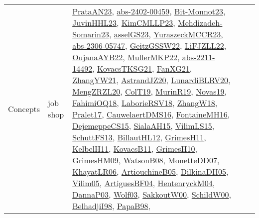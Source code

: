 {\begin{longtable}{llp{6cm}p{6cm}p{6cm}}
Concepts & job shop & \href{articles/PrataAN23.pdf}{PrataAN23}\cite{PrataAN23}, \href{articles/abs-2402-00459.pdf}{abs-2402-00459}\cite{abs-2402-00459}, \href{papers/Bit-Monnot23.pdf}{Bit-Monnot23}\cite{Bit-Monnot23}, \href{papers/JuvinHHL23.pdf}{JuvinHHL23}\cite{JuvinHHL23}, \href{papers/KimCMLLP23.pdf}{KimCMLLP23}\cite{KimCMLLP23}, \href{papers/Mehdizadeh-Somarin23.pdf}{Mehdizadeh-Somarin23}\cite{Mehdizadeh-Somarin23}, \href{papers/asselGS23.pdf}{asselGS23}\cite{asselGS23}, \href{articles/YuraszeckMCCR23.pdf}{YuraszeckMCCR23}\cite{YuraszeckMCCR23}, \href{articles/abs-2306-05747.pdf}{abs-2306-05747}\cite{abs-2306-05747}, \href{papers/GeitzGSSW22.pdf}{GeitzGSSW22}\cite{GeitzGSSW22}, \href{papers/LiFJZLL22.pdf}{LiFJZLL22}\cite{LiFJZLL22}, \href{papers/OujanaAYB22.pdf}{OujanaAYB22}\cite{OujanaAYB22}, \href{articles/MullerMKP22.pdf}{MullerMKP22}\cite{MullerMKP22}, \href{articles/abs-2211-14492.pdf}{abs-2211-14492}\cite{abs-2211-14492}, \href{papers/KovacsTKSG21.pdf}{KovacsTKSG21}\cite{KovacsTKSG21}, \href{articles/FanXG21.pdf}{FanXG21}\cite{FanXG21}, \href{articles/ZhangYW21.pdf}{ZhangYW21}\cite{ZhangYW21}, \href{articles/AstrandJZ20.pdf}{AstrandJZ20}\cite{AstrandJZ20}, \href{articles/LunardiBLRV20.pdf}{LunardiBLRV20}\cite{LunardiBLRV20}, \href{articles/MengZRZL20.pdf}{MengZRZL20}\cite{MengZRZL20}, \href{papers/ColT19.pdf}{ColT19}\cite{ColT19}, \href{papers/MurinR19.pdf}{MurinR19}\cite{MurinR19}, \href{articles/Novas19.pdf}{Novas19}\cite{Novas19}, \href{articles/FahimiOQ18.pdf}{FahimiOQ18}\cite{FahimiOQ18}, \href{articles/LaborieRSV18.pdf}{LaborieRSV18}\cite{LaborieRSV18}, \href{articles/ZhangW18.pdf}{ZhangW18}\cite{ZhangW18}, \href{papers/Pralet17.pdf}{Pralet17}\cite{Pralet17}, \href{papers/CauwelaertDMS16.pdf}{CauwelaertDMS16}\cite{CauwelaertDMS16}, \href{papers/FontaineMH16.pdf}{FontaineMH16}\cite{FontaineMH16}, \href{papers/DejemeppeCS15.pdf}{DejemeppeCS15}\cite{DejemeppeCS15}, \href{papers/SialaAH15.pdf}{SialaAH15}\cite{SialaAH15}, \href{papers/VilimLS15.pdf}{VilimLS15}\cite{VilimLS15}, \href{papers/SchuttFS13.pdf}{SchuttFS13}\cite{SchuttFS13}, \href{papers/BillautHL12.pdf}{BillautHL12}\cite{BillautHL12}, \href{papers/GrimesH11.pdf}{GrimesH11}\cite{GrimesH11}, \href{articles/KelbelH11.pdf}{KelbelH11}\cite{KelbelH11}, \href{articles/KovacsB11.pdf}{KovacsB11}\cite{KovacsB11}, \href{papers/GrimesH10.pdf}{GrimesH10}\cite{GrimesH10}, \href{papers/GrimesHM09.pdf}{GrimesHM09}\cite{GrimesHM09}, \href{papers/WatsonB08.pdf}{WatsonB08}\cite{WatsonB08}, \href{papers/MonetteDD07.pdf}{MonetteDD07}\cite{MonetteDD07}, \href{articles/KhayatLR06.pdf}{KhayatLR06}\cite{KhayatLR06}, \href{papers/ArtiouchineB05.pdf}{ArtiouchineB05}\cite{ArtiouchineB05}, \href{papers/DilkinaDH05.pdf}{DilkinaDH05}\cite{DilkinaDH05}, \href{papers/Vilim05.pdf}{Vilim05}\cite{Vilim05}, \href{papers/ArtiguesBF04.pdf}{ArtiguesBF04}\cite{ArtiguesBF04}, \href{papers/HentenryckM04.pdf}{HentenryckM04}\cite{HentenryckM04}, \href{papers/DannaP03.pdf}{DannaP03}\cite{DannaP03}, \href{papers/Wolf03.pdf}{Wolf03}\cite{Wolf03}, \href{articles/SakkoutW00.pdf}{SakkoutW00}\cite{SakkoutW00}, \href{articles/SchildW00.pdf}{SchildW00}\cite{SchildW00}, \href{articles/BelhadjiI98.pdf}{BelhadjiI98}\cite{BelhadjiI98}, \href{articles/PapaB98.pdf}{PapaB98}\cite{PapaB98}, 
\end{longtable}}
